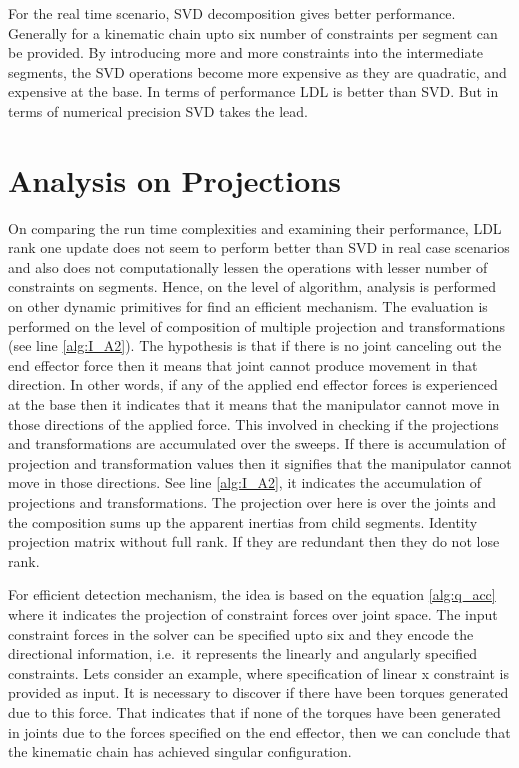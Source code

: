 For the real time scenario, SVD decomposition gives better performance. Generally for a kinematic chain upto six number of constraints per segment can be provided. By introducing more and more constraints into the intermediate segments, the SVD operations become more expensive as they are quadratic, and expensive at the base. In terms of performance LDL is better than SVD. But in terms of numerical precision SVD takes the lead.


\section{Analysis on Projections}
On comparing the run time complexities and examining their performance, LDL rank one update does not seem to perform better than SVD in real case scenarios and also does not computationally lessen the operations with lesser number of constraints on segments. Hence, on the level of algorithm, analysis is performed on other dynamic primitives for find an efficient mechanism. The evaluation is performed on the level of composition of multiple projection and transformations (see line \ref{alg:I_A2}). The hypothesis is that if there is no joint canceling out the end effector force then it means that joint cannot produce movement in that direction. In other words, if any of the applied end effector forces is experienced at the base then it indicates that it means that the manipulator cannot move in those directions of the applied force. This involved in checking if the projections and transformations are accumulated over the sweeps. If there is accumulation of projection and transformation values then it signifies that the manipulator cannot move in those directions. See line \ref{alg:I_A2}, it indicates the accumulation of projections and transformations. The projection over here is over the joints and the composition sums up the apparent inertias from child segments. Identity projection matrix without full rank. If they are redundant then they do not lose rank.



For efficient detection mechanism, the idea is based on the equation \ref{alg:q_acc} where it indicates the projection of constraint forces over joint space. The input constraint forces in the solver can be specified upto six and they encode the directional information, i.e.\ it represents the linearly and angularly specified constraints. Lets consider an example, where specification of linear x constraint is provided as input. It is necessary to discover if there have been torques generated due to this force. That indicates that if none of the torques have been generated in joints due to the forces specified on the end effector, then we can conclude that the kinematic chain has achieved singular configuration.



